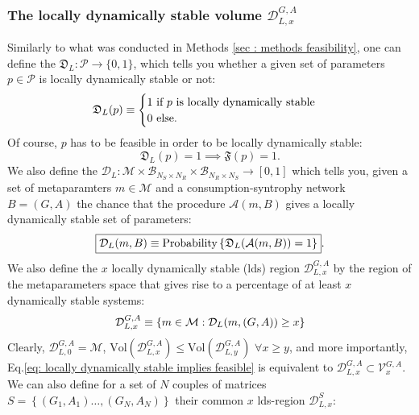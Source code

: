 \documentclass[12pt, titlepage]{report}
\begin{document}
\subsubsection{The locally dynamically stable volume $\mathcal{D}^{G,A}_{L,x}$} \label{sec: dynamical stability methods locally dynamically stable region}
Similarly to what was conducted in Methods \ref{sec : methods feasibility}, one can define the  $\mathfrak{D}_L: \mathcal{P} \rightarrow \{
0,1\}$, which tells you whether a given set of parameters $p \in \mathcal{P}$ is locally dynamically stable or not:
\begin{equation}
\mathfrak{D}_L(p)\equiv\begin{cases}
1 \text{ if } p \text{ is locally dynamically stable} \\
0 \text{ else.}
\end{cases}
\end{equation}
Of course, $p$ has to be feasible in order to be locally dynamically stable:
\begin{equation}
\mathfrak{D}_L(p)=1 \implies \mathfrak{F}(p)=1. \label{eq: locally dynamically stable implies feasible}
\end{equation}
We also define the  $\mathcal{D}_L: \mathcal{M} \times \mathcal{B}_{N_S \times N_R} \times \mathcal{B}_{N_R \times N_S} \rightarrow [0,1]$ which tells you, given a set of metaparamters $m \in \mathcal{M}$ and a consumption-syntrophy network $B=(G,A)$ the chance that the procedure $\mathcal{A}(m,B)$ gives a locally dynamically stable set of parameters:
\begin{equation}
\boxed{\mathcal{D}_L(m, B)\equiv\text{Probability}\left\{\mathfrak{D}_L(\mathcal{A}(m, B))=1\right\}}.
\end{equation}
We also define the $x$ locally dynamically stable (lds) region $\mathcal{D}_{L,x}^{G,A}$ by the region of the metaparameters space that gives rise to a percentage of at least $x$ dynamically stable systems:
\begin{equation}
\mathcal{D}_{L,x}^{G,A} \equiv \left\{m \in \mathcal{M}: \mathcal{D}_L(m, (G,A)) \geq x \right\}
\end{equation}
Clearly, $\mathcal{D}_{L,0}^{G,A}=\mathcal{M}$, $\text{Vol}\left(\mathcal{D}_{L,x}^{G,A}\right) \leq \text{Vol}\left(\mathcal{D}_{L,y}^{G,A}\right)$ $\forall x \geq y$, and more importantly, Eq.\eqref{eq: locally dynamically stable implies feasible} is equivalent to $\mathcal{D}_{L,x}^{G,A} \subset \mathcal{V}_x^{G,A}$. We can also define for a set of $N$ couples of matrices $S=\left\{(G_1, A_1) \dots, (G_N, A_N)\right\}$ their common $x$ lds-region $\mathcal{D}_{L,x}^S$:
\end{document}
